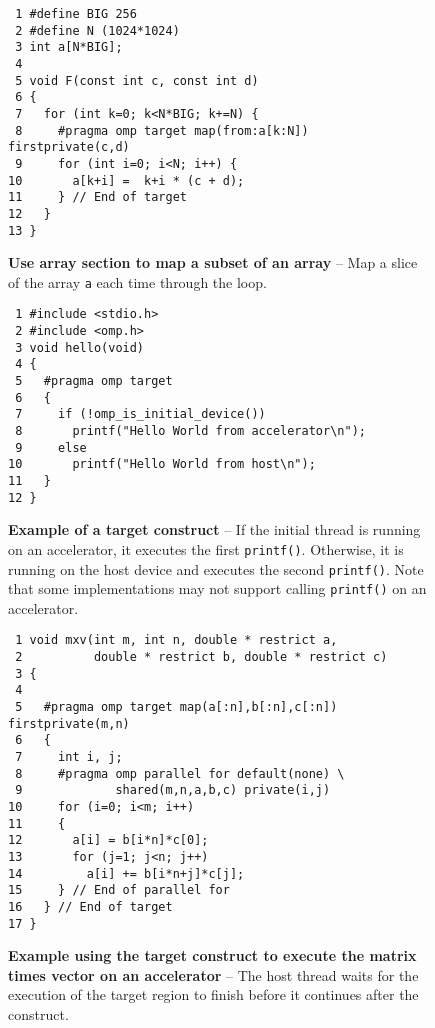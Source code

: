 \begin{figure*}[!tb]
\begin{verbatim}
 1 #define BIG 256
 2 #define N (1024*1024)
 3 int a[N*BIG];
 4 
 5 void F(const int c, const int d)
 6 {
 7   for (int k=0; k<N*BIG; k+=N) {
 8     #pragma omp target map(from:a[k:N]) firstprivate(c,d) 
 9     for (int i=0; i<N; i++) {
10       a[k+i] =  k+i * (c + d);
11     } // End of target
12   }
13 }
\end{verbatim}
\caption{ \textbf {Use array section to map a subset of an array} -- \small
          Map a slice of the array \texttt{a} each time through the loop.
         }
\label{figure:chapter6-mapslice}
\end{figure*}


\begin{figure*}[!tbhp]
\begin{verbatim}
 1 #include <stdio.h>
 2 #include <omp.h>
 3 void hello(void)
 4 {
 5   #pragma omp target 
 6   {
 7     if (!omp_is_initial_device())
 8       printf("Hello World from accelerator\n");
 9     else
10       printf("Hello World from host\n");
11   }
12 }
\end{verbatim}
\caption{ \textbf {Example of a target construct } -- \small
          If the initial thread is running on an accelerator, it executes the
          first \texttt{printf()}.
          Otherwise, it is running on the host device and
          executes the second \texttt{printf()}.
          Note that some implementations may not support calling \texttt{printf()} on an accelerator. 
         }
\label{figure:chapter6-hello}
\end{figure*}


\begin{figure*}[!tb]
\begin{verbatim}
 1 void mxv(int m, int n, double * restrict a,
 2          double * restrict b, double * restrict c)
 3 {
 4 
 5   #pragma omp target map(a[:n],b[:n],c[:n]) firstprivate(m,n)
 6   {
 7     int i, j;
 8     #pragma omp parallel for default(none) \
 9             shared(m,n,a,b,c) private(i,j)
10     for (i=0; i<m; i++)
11     {
12       a[i] = b[i*n]*c[0];
13       for (j=1; j<n; j++)
14         a[i] += b[i*n+j]*c[j];
15     } // End of parallel for
16   } // End of target
17 }
\end{verbatim}
\caption{ \textbf {Example using the target construct to execute the matrix 
                   times vector on an accelerator} -- \small
          The host thread waits for the execution of the target region to
          finish before it continues after the construct.
         }
\label{figure:chapter6-target-mxv}
\end{figure*}


